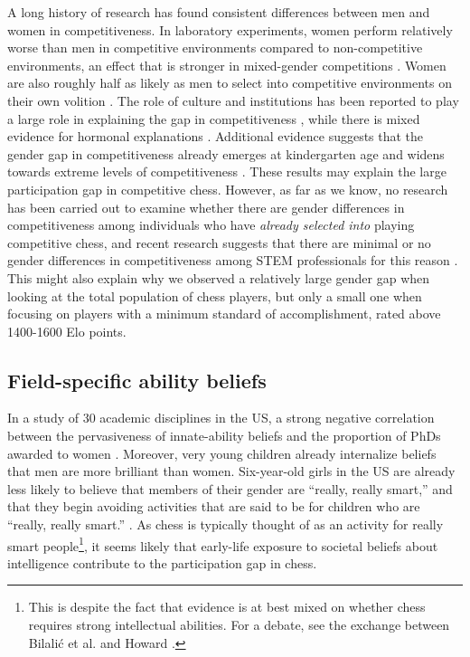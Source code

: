 \documentclass[9pt,twocolumn,twoside,lineno]{pnas-new}
\begin{document}
A long history of research has found consistent differences between men and women in competitiveness. In laboratory experiments, women perform relatively worse than men in competitive environments compared to non-competitive environments, an effect that is stronger in mixed-gender competitions \cite{gneezy2003}. Women are also roughly half as likely as men to select into competitive environments on their own volition \cite{niederle2007}. The role of culture and institutions has been reported to play a large role in explaining the gap in competitiveness \cite{booth2018,zhang2018,andersen2013}, while there is mixed evidence for hormonal explanations \cite{apicella2011,wozniak2014,sapienza2009gender}. Additional evidence suggests that the gender gap in competitiveness already emerges at kindergarten age \cite{sutter2015} and widens towards extreme levels of competitiveness \cite{saccardo2018}. These results may explain the large participation gap in competitive chess. However, as far as we know, no research has been carried out to examine whether there are gender differences in competitiveness among individuals who have \textit{already selected into} playing competitive chess, and recent research suggests that there are minimal or no gender differences in competitiveness among STEM professionals for this reason \cite{Boudreau2022}. This might also explain why we observed a relatively large gender gap when looking at the total population of chess players, but only a small one when focusing on players with a minimum standard of accomplishment, rated above 1400-1600 Elo points.


\subsection*{Field-specific ability beliefs}

In a study of 30 academic disciplines in the US, a strong negative correlation between the pervasiveness of innate-ability beliefs and the proportion of PhDs awarded to women \cite{leslie2015expectations}. Moreover, very young children already internalize beliefs that men are more brilliant than women.  Six-year-old girls in the US are already less likely to believe that members of their gender are ``really, really smart,'' and that they begin avoiding activities that are said to be for children who are ``really, really smart.'' \cite{bian2017gender}. As chess is typically thought of as an activity for really smart people\footnote{This is despite the fact that evidence is at best mixed on whether chess requires strong intellectual abilities. For a debate, see the exchange between Bilali\'c et al. \cite{bilalic2006reply} and Howard \cite{howard2006iq}.}, it seems likely that early-life exposure to societal beliefs about intelligence contribute to the participation gap in chess.
\end{document}
